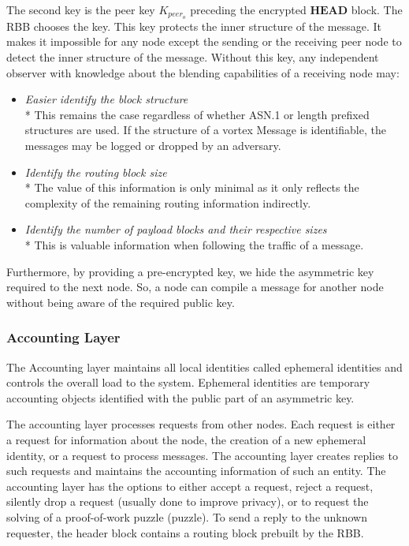 \documentclass[10pt,journal,compsoc,twocolumn,twoside]{IEEEtran}
\begin{document}
The second key is the peer key $K_{peer_o}$ preceding the encrypted $\mathbf{HEAD}$ block. The RBB chooses the key. This key protects the inner structure of the message. It makes it impossible for any node except the sending or the receiving peer node to detect the inner structure of the message. Without this key, any independent observer with knowledge about the blending capabilities of a receiving node may:
\begin{itemize}
	\item \emph{Easier identify the block structure}\\*
	This remains the case regardless of whether ASN.1 or length prefixed structures are used. If the structure of a vortex Message is identifiable, the messages may be logged or dropped by an adversary.
	\item \emph{Identify the routing block size}\\*
	The value of this information is only minimal as it only reflects the complexity of the remaining routing information indirectly.
	\item \emph{Identify the number of payload blocks and their respective sizes}\\*
	This is valuable information when following the traffic of a message.
\end{itemize}

Furthermore, by providing a pre-encrypted key, we hide the asymmetric key required to the next node. So, a node can compile a message for another node without being aware of the required public key.

\subsubsection{Accounting Layer}
The Accounting layer maintains all local identities called ephemeral identities and controls the overall load to the system. Ephemeral identities are temporary accounting objects identified with the public part of an asymmetric key. 

The accounting layer processes requests from other nodes. Each request is either a request for information about the node, the creation of a new ephemeral identity, or a request to process messages. The accounting layer creates replies to such requests and maintains the accounting information of such an entity. The accounting layer has the options to either accept a request, reject a request, silently drop a request (usually done to improve privacy), or to request the solving of a proof-of-work puzzle (puzzle). To send a reply to the unknown requester, the header block contains a routing block prebuilt by the RBB.
\end{document}
